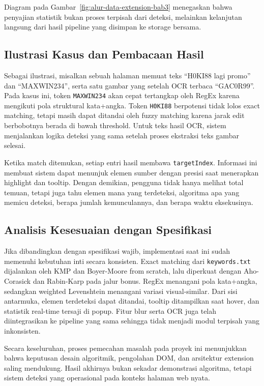 Diagram pada Gambar~\ref{fig:alur-data-extension-bab3} menegaskan bahwa penyajian statistik bukan proses terpisah dari deteksi, melainkan kelanjutan langsung dari hasil pipeline yang disimpan ke storage bersama.

\subsection{Ilustrasi Kasus dan Pembacaan Hasil}

Sebagai ilustrasi, misalkan sebuah halaman memuat teks ``H0KI88 lagi promo'' dan ``MAXWIN234'', serta satu gambar yang setelah OCR terbaca ``GAC0R99''. Pada kasus ini, token \texttt{MAXWIN234} akan cepat tertangkap oleh RegEx karena mengikuti pola struktural kata+angka. Token \texttt{H0KI88} berpotensi tidak lolos exact matching, tetapi masih dapat ditandai oleh fuzzy matching karena jarak edit berbobotnya berada di bawah threshold. Untuk teks hasil OCR, sistem menjalankan logika deteksi yang sama setelah proses ekstraksi teks gambar selesai.

Ketika match ditemukan, setiap entri hasil membawa \texttt{targetIndex}. Informasi ini membuat sistem dapat menunjuk elemen sumber dengan presisi saat menerapkan highlight dan tooltip. Dengan demikian, pengguna tidak hanya melihat total temuan, tetapi juga tahu elemen mana yang terdeteksi, algoritma apa yang memicu deteksi, berapa jumlah kemunculannya, dan berapa waktu eksekusinya.

\subsection{Analisis Kesesuaian dengan Spesifikasi}

Jika dibandingkan dengan spesifikasi wajib, implementasi saat ini sudah memenuhi kebutuhan inti secara konsisten. Exact matching dari \texttt{keywords.txt} dijalankan oleh KMP dan Boyer-Moore from scratch, lalu diperkuat dengan Aho-Corasick dan Rabin-Karp pada jalur bonus. RegEx menangani pola kata+angka, sedangkan weighted Levenshtein menangani variasi visual-similar. Dari sisi antarmuka, elemen terdeteksi dapat ditandai, tooltip ditampilkan saat hover, dan statistik real-time tersaji di popup. Fitur blur serta OCR juga telah diintegrasikan ke pipeline yang sama sehingga tidak menjadi modul terpisah yang inkonsisten.

Secara keseluruhan, proses pemecahan masalah pada proyek ini menunjukkan bahwa keputusan desain algoritmik, pengolahan DOM, dan arsitektur extension saling mendukung. Hasil akhirnya bukan sekadar demonstrasi algoritma, tetapi sistem deteksi yang operasional pada konteks halaman web nyata.
